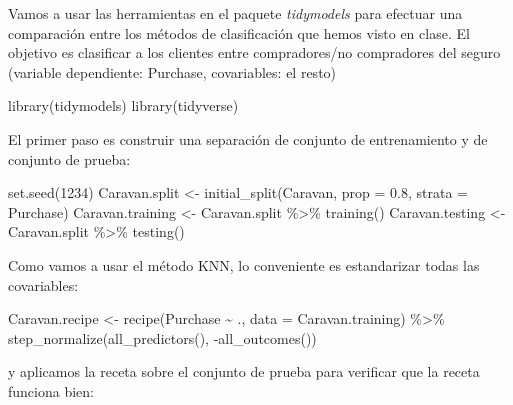 \documentclass[
  12pt,
]{book}
\newenvironment{Shaded}{\begin{snugshade}}{\end{snugshade}}
\newcommand{\AttributeTok}[1]{\textcolor[rgb]{0.77,0.63,0.00}{#1}}
\newcommand{\DecValTok}[1]{\textcolor[rgb]{0.00,0.00,0.81}{#1}}
\newcommand{\FloatTok}[1]{\textcolor[rgb]{0.00,0.00,0.81}{#1}}
\newcommand{\FunctionTok}[1]{\textcolor[rgb]{0.00,0.00,0.00}{#1}}
\newcommand{\NormalTok}[1]{#1}
\newcommand{\OtherTok}[1]{\textcolor[rgb]{0.56,0.35,0.01}{#1}}
\newcommand{\SpecialCharTok}[1]{\textcolor[rgb]{0.00,0.00,0.00}{#1}}
\theoremstyle{definition}
\theoremstyle{definition}
\theoremstyle{definition}
\theoremstyle{definition}
\theoremstyle{remark}
\begin{document}
Vamos a usar las herramientas en el paquete \emph{tidymodels} para efectuar una comparación entre los métodos de clasificación que hemos visto en clase. El objetivo es clasificar a los clientes entre compradores/no compradores del seguro (variable dependiente: Purchase, covariables: el resto)

\begin{Shaded}
\begin{Highlighting}[]
\FunctionTok{library}\NormalTok{(tidymodels)}
\FunctionTok{library}\NormalTok{(tidyverse)}
\end{Highlighting}
\end{Shaded}

El primer paso es construir una separación de conjunto de entrenamiento y de conjunto de prueba:

\begin{Shaded}
\begin{Highlighting}[]
\FunctionTok{set.seed}\NormalTok{(}\DecValTok{1234}\NormalTok{)}
\NormalTok{Caravan.split }\OtherTok{\textless{}{-}} \FunctionTok{initial\_split}\NormalTok{(Caravan, }\AttributeTok{prop =} \FloatTok{0.8}\NormalTok{,}
    \AttributeTok{strata =}\NormalTok{ Purchase)}
\NormalTok{Caravan.training }\OtherTok{\textless{}{-}}\NormalTok{ Caravan.split }\SpecialCharTok{\%\textgreater{}\%}
    \FunctionTok{training}\NormalTok{()}
\NormalTok{Caravan.testing }\OtherTok{\textless{}{-}}\NormalTok{ Caravan.split }\SpecialCharTok{\%\textgreater{}\%}
    \FunctionTok{testing}\NormalTok{()}
\end{Highlighting}
\end{Shaded}

Como vamos a usar el método KNN, lo conveniente es estandarizar todas las covariables:

\begin{Shaded}
\begin{Highlighting}[]
\NormalTok{Caravan.recipe }\OtherTok{\textless{}{-}} \FunctionTok{recipe}\NormalTok{(Purchase }\SpecialCharTok{\textasciitilde{}}\NormalTok{ ., }\AttributeTok{data =}\NormalTok{ Caravan.training) }\SpecialCharTok{\%\textgreater{}\%}
    \FunctionTok{step\_normalize}\NormalTok{(}\FunctionTok{all\_predictors}\NormalTok{(), }\SpecialCharTok{{-}}\FunctionTok{all\_outcomes}\NormalTok{())}
\end{Highlighting}
\end{Shaded}

y aplicamos la receta sobre el conjunto de prueba para verificar que la receta funciona bien:
\end{document}
